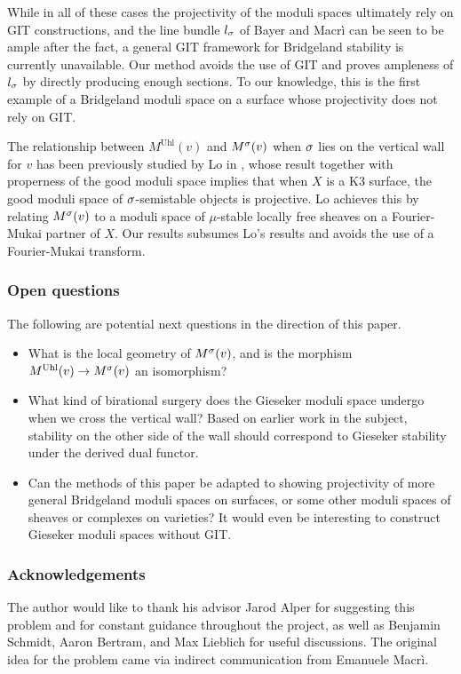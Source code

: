 \documentclass[letterpaper,11pt]{amsart}%
\theoremstyle{remark}
\begin{document}
While in all of these cases the projectivity of the moduli spaces ultimately rely on GIT constructions, and the line bundle $l_\sigma$ of Bayer and Macr\`i can be seen to be ample after the fact, a general GIT framework for Bridgeland stability is currently unavailable. Our method avoids the use of GIT and proves ampleness of $l_\sigma$ by directly producing enough sections. To our knowledge, this is the first example of a Bridgeland moduli space on a surface whose projectivity does not rely on GIT.

The relationship between $M^{\mathrm{Uhl}}(v)$ and $M^\sigma(v)$ when $\sigma$ lies on the vertical wall for $v$ has been previously studied by Lo in \cite{lo}, whose result together with properness of the good moduli space implies that when $X$ is a K3 surface, the good moduli space of $\sigma$-semistable objects is projective. Lo achieves this by relating $M^\sigma(v)$ to a moduli space of $\mu$-stable locally free sheaves on a Fourier-Mukai partner of $X$. Our results subsumes Lo's results and avoids the use of a Fourier-Mukai transform.

\subsubsection*{Open questions}
The following are potential next questions in the direction of this paper.
\begin{itemize}
    \item What is the local geometry of $M^\sigma(v)$, and is the morphism $M^{\mathrm{Uhl}}(v) \to M^\sigma(v)$ an isomorphism?
    \item What kind of birational surgery does the Gieseker moduli space undergo when we cross the vertical wall? Based on earlier work in the subject, stability on the other side of the wall should correspond to Gieseker stability under the derived dual functor.
    \item Can the methods of this paper be adapted to showing projectivity of more general Bridgeland moduli spaces on surfaces, or some other moduli spaces of sheaves or complexes on varieties? It would even be interesting to construct Gieseker moduli spaces without GIT. 
\end{itemize}

\subsubsection*{Acknowledgements}

The author would like to thank his advisor Jarod Alper for suggesting this problem and for constant guidance throughout the project, as well as Benjamin Schmidt, Aaron Bertram, and Max Lieblich for useful discussions. The original idea for the problem came via indirect communication from Emanuele Macr\`i. 
\end{document}
